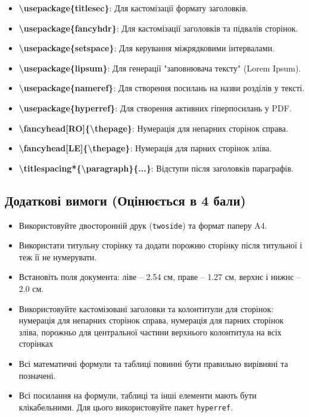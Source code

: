 \begin{itemize}
		\item \textbf{\textbackslash usepackage\{titlesec\}}: Для кастомізації формату заголовків.
		
		\item \textbf{\textbackslash usepackage\{fancyhdr\}}: Для кастомізації заголовків та підвалів сторінок.
		
		\item \textbf{\textbackslash usepackage\{setspace\}}: Для керування міжрядковими інтервалами.
		
		\item \textbf{\textbackslash usepackage\{lipsum\}}: Для генерації "заповнювача тексту" (Lorem Ipsum).
		
		\item \textbf{\textbackslash usepackage\{nameref\}}: Для створення посилань на назви розділів у тексті.
		
		\item \textbf{\textbackslash usepackage\{hyperref\}}: Для створення активних гіперпосилань у PDF.
		
		\item \textbf{\textbackslash fancyhead[RO]\{\textbackslash thepage\}}: Нумерація для непарних сторінок справа.
		
		\item \textbf{\textbackslash fancyhead[LE]\{\textbackslash thepage\}}: Нумерація для парних сторінок зліва.
		
		\item \textbf{\textbackslash titlespacing*\{\textbackslash paragraph\}\{...\}}: Відступи після заголовків параграфів.
	\end{itemize}
	
	
	\subsection{Додаткові вимоги (Оцінюється в 4 бали)}
	\begin{itemize}
		\item Використовуйте двосторонній друк (\texttt{twoside}) та формат паперу A4.
		\item Використати титульну сторінку та додати порожню сторінку після титульної і теж її не нумерувати.
		\item Встановіть поля документа: ліве – 2.54 см, праве – 1.27 см, верхнє і нижнє – 2.0 см.
		\item Використовуйте кастомізовані заголовки та колонтитули для сторінок: нумерація для непарних сторінок справа, нумерація для парних сторінок зліва, порожньо для центральної частини верхнього колонтитула на всіх сторінках
		\item Всі математичні формули та таблиці повинні бути правильно вирівняні та позначені.
		\item Всі посилання на формули, таблиці та інші елементи мають бути клікабельними. Для цього використовуйте пакет \texttt{hyperref}.
	\end{itemize}
	
